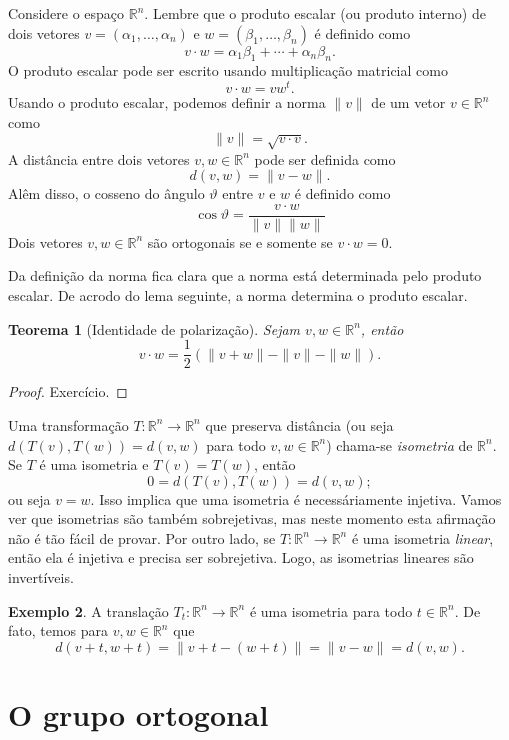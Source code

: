 \documentclass[12pt]{amsart}
\newcommand{\R}{\mathbb R}
\newtheorem{theorem}{Teorema}
\theoremstyle{definition}
\newtheorem{example}[theorem]{Exemplo}
\begin{document}
Considere o espaço $\R^n$. Lembre que o produto escalar (ou produto interno) de dois vetores 
$v=(\alpha_1,\ldots,\alpha_n)$ e $w=(\beta_1,\ldots,\beta_n)$ é definido como 
\[
    v\cdot w=\alpha_1\beta_1+\cdots+\alpha_n\beta_n.
\]
O produto escalar pode ser escrito usando multiplicação matricial como 
\[
    v\cdot w=vw^t.
\]
Usando o produto escalar, podemos definir a norma $\|v\|$ de um vetor $v\in\R^n$ como
\[
    \|v\|=\sqrt{v\cdot v}.
\] 
A distância entre dois vetores $v,w\in \R^n$ pode ser definida como 
\[
    d(v,w)=\|v-w\|.
\]
Alêm disso, o cosseno do ângulo $\vartheta$ entre $v$ e $w$ é definido como 
\[
    \cos\vartheta=\frac{v\cdot w}{\|v\|\|w\|}
\]
Dois vetores $v,w\in \R^n$ são ortogonais se e somente se $v\cdot w=0$.

Da definição da norma fica clara que a norma está determinada pelo produto escalar. De acrodo do lema seguinte, 
a norma determina o produto escalar.

\begin{theorem}[Identidade de polarização]   Sejam $v,w\in \R^n$, então 
    \[
        v\cdot w=\frac 12\left(\|v+w\|-\|v\|-\|w\|\right).
\]
\end{theorem}
\begin{proof}
    Exercício.
\end{proof}

Uma transformação $T:\R^n\to\R^n$ que preserva distância (ou seja $d(T(v),T(w))=d(v,w)$ para 
todo $v,w\in \R^n$) chama-se \emph{isometria} de $\R^n$. Se $T$ é uma isometria e $T(v)=T(w)$, então 
\[
    0=d(T(v),T(w))=d(v,w);
\]
ou seja $v=w$. Isso implica que uma isometria é necessáriamente injetiva. Vamos ver que isometrias são 
também sobrejetivas, mas neste momento esta afirmação não é tão fácil de provar. Por outro lado, se 
$T:\R^n\to\R^n$ é  uma isometria \emph{linear}, então ela é injetiva e precisa ser sobrejetiva. Logo, as 
isometrias lineares são invertíveis.

\begin{example}
    A translação $T_t:\R^n\to \R^n$ é uma isometria para todo $t\in\R^n$. De fato, temos 
    para $v,w\in\R^n$ que 
    \[
        d(v+t,w+t)=\|v+t-(w+t)\|=\|v-w\|=d(v,w).
    \]
\end{example}


\section{O grupo ortogonal}
\end{document}
